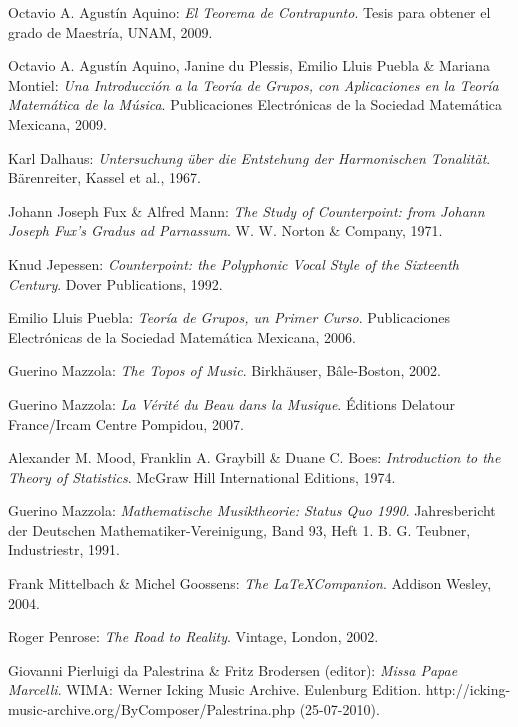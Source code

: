 \documentclass[letterpaper,12pt]{book}
\theoremstyle{definition} \newtheorem{Def}{Definición}[chapter]
\theoremstyle{definition} \newtheorem{Teo}{Teorema}[chapter]
\theoremstyle{definition} \newtheorem{Pro}{Proposición}[chapter]
\theoremstyle{definition} \newtheorem{Lema}{Lema}[chapter]
\begin{document}
\backmatter
\begin{thebibliography}{30}

 Octavio A. Agustín Aquino: \emph{El Teorema de Contrapunto}. Tesis para obtener el grado de Maestría, UNAM, 2009.

 Octavio A. Agustín Aquino, Janine du Plessis, Emilio Lluis Puebla \& Mariana Montiel: \emph{Una Introducción a la Teoría de Grupos, con Aplicaciones en la Teoría Matemática de la Música}. Publicaciones Electrónicas de la Sociedad Matemática Mexicana, 2009.

 Karl Dalhaus: \emph{Untersuchung über die Entstehung der Harmonischen Tonalität}. Bärenreiter, Kassel et al., 1967.

 Johann Joseph Fux \& Alfred Mann: \emph{The Study of Counterpoint: from Johann Joseph Fux's Gradus ad Parnassum}. W. W. Norton \& Company, 1971.

 Knud Jepessen: \emph{Counterpoint: the Polyphonic Vocal Style of the Sixteenth Century}. Dover Publications, 1992.

 Emilio Lluis Puebla: \emph{Teoría de Grupos, un Primer Curso}. Publicaciones Electrónicas de la Sociedad Matemática Mexicana, 2006.

 Guerino Mazzola: \emph{The Topos of Music}. Birkhäuser, Bâle-Boston, 2002.

 Guerino Mazzola: \emph{La Vérité du Beau dans la Musique}. Éditions Delatour France/Ircam Centre Pompidou, 2007.

 Alexander M. Mood, Franklin A. Graybill \& Duane C. Boes: \emph{Introduction to the Theory of Statistics}. McGraw Hill International Editions, 1974.

 Guerino Mazzola: \emph{Mathematische Musiktheorie: Status Quo 1990}. Jahresbericht der Deutschen Mathematiker-Vereinigung, Band 93, Heft 1. B. G. Teubner, Industriestr, 1991.

 Frank Mittelbach \& Michel Goossens: \emph{The \LaTeX Companion}. Addison Wesley, 2004.

 Roger Penrose: \emph{The Road to Reality}. Vintage, London, 2002.

 Giovanni Pierluigi da Palestrina \& Fritz Brodersen (editor): \emph{Missa Papae Marcelli}. WIMA: Werner Icking Music Archive. Eulenburg Edition. 
http://icking-music-archive.org/ByComposer/Palestrina.php (25-07-2010).


\end{thebibliography}
\end{document}
